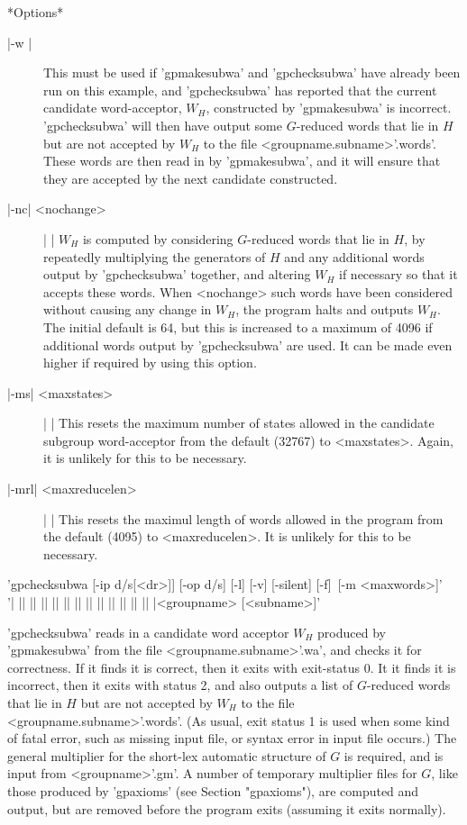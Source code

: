 *Options*\\
\begin{description}
\item[|-w |] This must be used if 'gpmakesubwa' and 'gpchecksubwa' have already
been run on this example, and 'gpchecksubwa' has reported that the
current candidate word-acceptor, $W_H$, constructed by 'gpmakesubwa' is
incorrect. 'gpchecksubwa' will then have output some $G$-reduced words that
lie in $H$ but are not accepted by $W_H$ to the file
<groupname.subname>'.words'.  These words are then read in by 'gpmakesubwa',
and it will ensure that they are accepted by the next candidate constructed.
\item[|-nc| <nochange>]| |\newline
$W_H$ is computed by considering $G$-reduced words
that lie in $H$, by repeatedly multiplying the generators of $H$ and
any additional words output by 'gpchecksubwa' together, and altering
$W_H$ if necessary so that it accepts these words.
When <nochange> such words have been considered without causing any
change in $W_H$, the program halts and outputs $W_H$.
The initial default is 64, but this is increased to a
maximum of 4096 if additional words output by 'gpchecksubwa' are used.
It can be made even higher if required by using this option.
\item[|-ms| <maxstates>]| |\newline
This resets the maximum number of states allowed in the candidate subgroup
word-acceptor from the default (32767) to <maxstates>.
Again, it is unlikely for this to be necessary.
\item[|-mrl| <maxreducelen>]| |\newline
This resets the maximul length of words allowed in the program from the default
(4095) to <maxreducelen>. It is unlikely for this to be necessary.
\end{description}


'gpchecksubwa [-ip d/s[<dr>]] [-op d/s] [-l] [-v] [-silent] [-f]\
[-m <maxwords>]'\\
'| || || || || || || || || || || || || |<groupname> [<subname>]'

'gpchecksubwa' reads in a candidate word acceptor $W_H$ produced by
'gpmakesubwa' from the file <groupname.subname>'.wa', and checks it for
correctness. If it finds it is correct, then it exits with exit-status 0.
It it finds it is incorrect, then it exits with status 2, and also
outputs a list of $G$-reduced words that lie in $H$ but are not accepted
by $W_H$ to the file <groupname.subname>'.words'.
(As usual, exit status 1 is used when some kind of fatal error, such as
missing input file, or syntax error in input file occurs.)
The general multiplier for the short-lex automatic structure of $G$ is
required, and is input from <groupname>'.gm'. A number of temporary
multiplier files for $G$, like those produced by 'gpaxioms' (see
Section "gpaxioms"), are computed and output, but are removed before
the program exits (assuming it exits normally).

